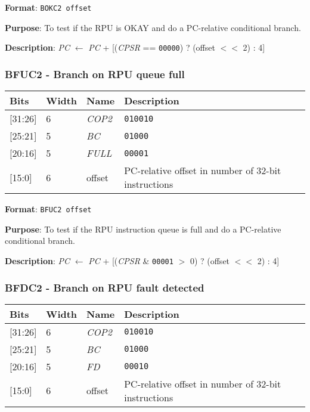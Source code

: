 \documentclass[11pt]{article}
\begin{document}
\textbf{Format}: \texttt{BOKC2 offset}

\textbf{Purpose}: To test if the RPU is OKAY and do a PC-relative conditional branch.

\textbf{Description}: \emph{PC} $\leftarrow$ \emph{PC} + [(\emph{CPSR} == \texttt{00000}) ? (offset $<<$ 2) : 4]

\text{}
\subsubsection{BFUC2 - Branch on RPU queue full}
\text{}

\begin{table}[H] \centering
  \def\arraystretch{1.4}
  \begin{tabular}{|m{2cm}|m{1.5cm}|m{2.5cm}|m{4.5cm}|}
    \hline
    \textbf{Bits} & \textbf{Width} & \textbf{Name} & \textbf{Description}\\ \hline

    [31:26] & 6 & \emph{COP2} & \texttt{010010}\\ \hline

    [25:21] & 5 & \emph{BC} & \texttt{01000}\\ \hline

    [20:16] & 5 & \emph{FULL} & \texttt{00001}\\ \hline

    [15:0] & 6 & offset & PC-relative offset in number of 32-bit instructions\\ \hline
  \end{tabular}
\end{table}

\textbf{Format}: \texttt{BFUC2 offset}

\textbf{Purpose}: To test if the RPU instruction queue is full and do a PC-relative conditional branch.

\textbf{Description}: \emph{PC} $\leftarrow$ \emph{PC} + [(\emph{CPSR} \& \texttt{00001} $>$ 0) ? (offset $<<$ 2) : 4]

\text{}
\subsubsection{BFDC2 - Branch on RPU fault detected}
\text{}

\begin{table}[H] \centering
  \def\arraystretch{1.4}
  \begin{tabular}{|m{2cm}|m{1.5cm}|m{2.5cm}|m{4.5cm}|}
    \hline
    \textbf{Bits} & \textbf{Width} & \textbf{Name} & \textbf{Description}\\ \hline

    [31:26] & 6 & \emph{COP2} & \texttt{010010}\\ \hline

    [25:21] & 5 & \emph{BC} & \texttt{01000}\\ \hline

    [20:16] & 5 & \emph{FD} & \texttt{00010}\\ \hline

    [15:0] & 6 & offset & PC-relative offset in number of 32-bit instructions\\ \hline
  \end{tabular}
\end{table}
\end{document}
